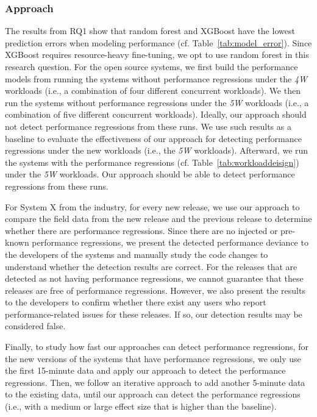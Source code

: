 \subsubsection*{Approach}

The results from RQ1 show that random forest and XGBoost have the lowest prediction errors when modeling performance (cf. Table~\ref{tab:model_error}). Since XGBoost requires resource-heavy fine-tuning, we opt to use random forest in this research question. For the open source systems, we first build the performance models from running the systems without performance regressions under the \emph{4W} workloads (i.e., a combination of four different concurrent workloads). We then run the systems without performance regressions under the \emph{5W} workloads (i.e., a combination of five different concurrent workloads). Ideally, our approach should not detect performance regressions from these runs. 
We use such results as a baseline to evaluate the effectiveness of our approach for detecting performance regressions under the new workloads (i.e., the \emph{5W} workloads). 
Afterward, we run the systems with the performance regressions (cf. Table~\ref{tab:workloaddeisign}) under the \emph{5W} workloads. Our approach should be able to detect performance regressions from these runs.

For System X from the industry, for every new release, we use our approach to compare the field data from the new release and the previous release to determine whether there are performance regressions. Since there are no injected or pre-known performance regressions, we present the detected performance deviance to the developers of the systems and manually study the code changes to understand whether the detection results are correct. For the releases that are detected as not having performance regressions, we cannot guarantee that these releases are free of performance regressions. However, we also present the results to the developers to confirm whether there exist any users who report performance-related issues for these releases. If so, our detection results may be considered false.

Finally, to study how fast our approaches can detect performance regressions, for the new versions of the systems that have performance regressions, we only use the first 15-minute data and apply our approach to detect the performance regressions. Then, we follow an iterative approach to add another 5-minute data to the existing data, until our approach can detect the performance regressions (i.e., with a medium or large effect size that is higher than the baseline). 

